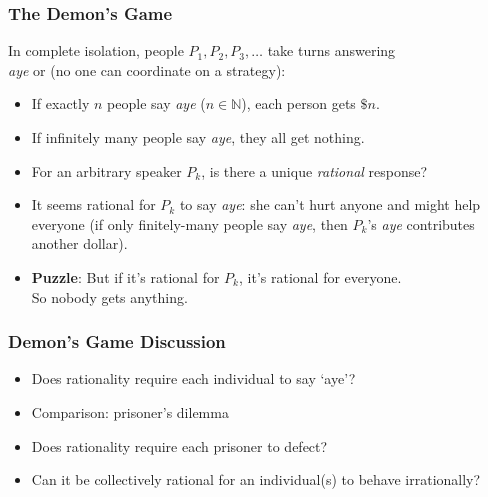 \begin{frame}
\frametitle{The Demon's Game}

In complete isolation, people \(P_1,P_2,P_3,\ldots\) take turns answering \\ \emph{aye} or  (no one can coordinate on a strategy):

\begin{itemize}[<+->]

\item If exactly $n$ people say \emph{aye} ($n \in \mathbb{N}$), each person gets $\$n$. 

\item If infinitely many people say \emph{aye}, they all get nothing.

\item For an arbitrary speaker $P_k$, is there a unique \textit{rational} response?

\item It seems rational for $P_k$ to say \emph{aye}: she can't hurt anyone and might help everyone (if only finitely-many people say \emph{aye}, then $P_k$'s \emph{aye} contributes another dollar). 

\item \textbf{Puzzle}: But if it's rational for $P_k$, it's rational for everyone. \\ So nobody gets anything.

\end{itemize}
\end{frame}



\begin{frame}
\frametitle{Demon's Game Discussion}

\begin{itemize}[<+->]

\item Does rationality require each individual to say `aye'? 

\item Comparison: prisoner's dilemma

\item Does rationality require each prisoner to defect?

\item Can it be collectively rational for an individual(s) to behave irrationally? 

\end{itemize}
\end{frame}

